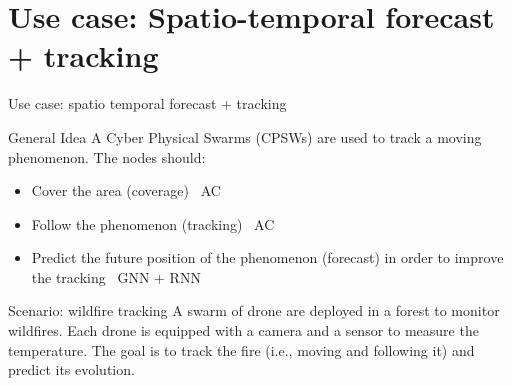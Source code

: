 \documentclass[presentation, 9pt]{beamer}\mode<presentation>{\usetheme{AMSBolognaFC}}
\begin{document}
\section{Use case: Spatio-temporal forecast + tracking}
\begin{frame}{Use case: spatio temporal forecast + tracking}
\begin{alertblock}{General Idea}
	A Cyber Physical Swarms (CPSWs) are used to track a moving phenomenon. The nodes should:
	\begin{itemize}
		\item Cover the area (coverage) \faArrowRight \, AC
		\item Follow the phenomenon (tracking) \faArrowRight \, AC
		\item Predict the future position of the phenomenon (forecast) in order to improve the tracking \faArrowRight \, GNN + RNN
	\end{itemize}
\end{alertblock}
\begin{alertblock}{Scenario: wildfire tracking}
	A swarm of drone are deployed in a forest to monitor wildfires. 
	Each drone is equipped with a camera and a sensor to measure the temperature. 
	The goal is to track the fire (i.e., moving and following it) and predict its evolution.
\end{alertblock}
\end{frame}
\end{document}
